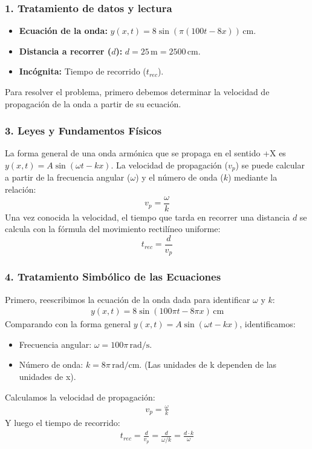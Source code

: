 \subsubsection*{1. Tratamiento de datos y lectura}
\begin{itemize}
    \item \textbf{Ecuación de la onda:} $y(x,t) = 8\sin(\pi(100t-8x)) \, \text{cm}$.
    \item \textbf{Distancia a recorrer ($d$):} $d = 25 \, \text{m} = 2500 \, \text{cm}$.
    \item \textbf{Incógnita:} Tiempo de recorrido ($t_{rec}$).
\end{itemize}
Para resolver el problema, primero debemos determinar la velocidad de propagación de la onda a partir de su ecuación.

\subsubsection*{3. Leyes y Fundamentos Físicos}
La forma general de una onda armónica que se propaga en el sentido +X es $y(x,t) = A\sin(\omega t - kx)$. La velocidad de propagación ($v_p$) se puede calcular a partir de la frecuencia angular ($\omega$) y el número de onda ($k$) mediante la relación:
$$ v_p = \frac{\omega}{k} $$
Una vez conocida la velocidad, el tiempo que tarda en recorrer una distancia $d$ se calcula con la fórmula del movimiento rectilíneo uniforme:
$$ t_{rec} = \frac{d}{v_p} $$

\subsubsection*{4. Tratamiento Simbólico de las Ecuaciones}
Primero, reescribimos la ecuación de la onda dada para identificar $\omega$ y $k$:
\begin{gather}
    y(x,t) = 8\sin(100\pi t - 8\pi x) \, \text{cm}
\end{gather}
Comparando con la forma general $y(x,t) = A\sin(\omega t - kx)$, identificamos:
\begin{itemize}
    \item Frecuencia angular: $\omega = 100\pi \, \text{rad/s}$.
    \item Número de onda: $k = 8\pi \, \text{rad/cm}$. (Las unidades de k dependen de las unidades de x).
\end{itemize}
Calculamos la velocidad de propagación:
\begin{gather}
    v_p = \frac{\omega}{k}
\end{gather}
Y luego el tiempo de recorrido:
\begin{gather}
    t_{rec} = \frac{d}{v_p} = \frac{d}{\omega/k} = \frac{d \cdot k}{\omega}
\end{gather}

